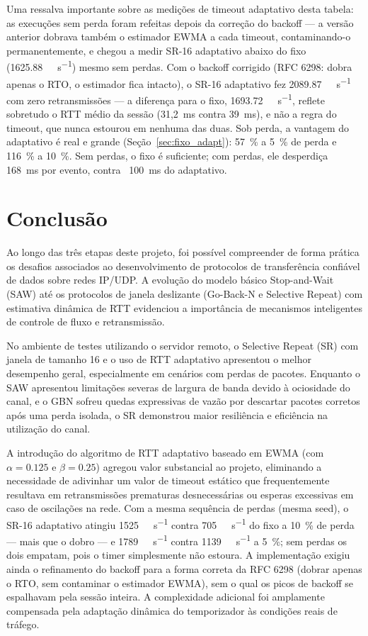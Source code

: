 \documentclass[11pt,a4paper]{article}
\begin{document}
Uma ressalva importante sobre as medições de timeout adaptativo desta tabela: as
execuções sem perda foram refeitas depois da correção do backoff — a versão
anterior dobrava também o estimador EWMA a cada timeout, contaminando-o
permanentemente, e chegou a medir SR-16 adaptativo abaixo do fixo
(\SI{1625.88}{\kilo\bit\per\second}) mesmo sem perdas. Com o backoff corrigido
(RFC 6298: dobra apenas o RTO, o estimador fica intacto), o SR-16 adaptativo
fez \SI{2089.87}{\kilo\bit\per\second} com zero retransmissões — a diferença
para o fixo, \SI{1693.72}{\kilo\bit\per\second}, reflete sobretudo o RTT médio
da sessão (31,2~ms contra 39~ms), e não a regra do timeout, que nunca estourou
em nenhuma das duas. Sob perda, a vantagem do adaptativo é real e grande
(Seção~\ref{sec:fixo_adapt}): \SI{57}{\percent} a \SI{5}{\percent} de perda e
\SI{116}{\percent} a \SI{10}{\percent}. Sem perdas, o fixo é suficiente; com
perdas, ele desperdiça \SI{168}{\milli\second} por evento, contra ~\SI{100}{\milli\second}
do adaptativo.


\section{Conclusão}
Ao longo das três etapas deste projeto, foi possível compreender de forma prática os desafios associados ao desenvolvimento de protocolos de transferência confiável de dados sobre redes IP/UDP. A evolução do modelo básico Stop-and-Wait (SAW) até os protocolos de janela deslizante (Go-Back-N e Selective Repeat) com estimativa dinâmica de RTT evidenciou a importância de mecanismos inteligentes de controle de fluxo e retransmissão.

No ambiente de testes utilizando o servidor remoto, o Selective Repeat (SR) com janela de tamanho 16 e o uso de RTT adaptativo apresentou o melhor desempenho geral, especialmente em cenários com perdas de pacotes. Enquanto o SAW apresentou limitações severas de largura de banda devido à ociosidade do canal, e o GBN sofreu quedas expressivas de vazão por descartar pacotes corretos após uma perda isolada, o SR demonstrou maior resiliência e eficiência na utilização do canal.

A introdução do algoritmo de RTT adaptativo baseado em EWMA (com $\alpha = 0.125$ e $\beta = 0.25$) agregou valor substancial ao projeto, eliminando a necessidade de adivinhar um valor de timeout estático que frequentemente resultava em retransmissões prematuras desnecessárias ou esperas excessivas em caso de oscilações na rede. Com a mesma sequência de perdas (mesma seed), o SR-16 adaptativo atingiu \SI{1525}{\kilo\bit\per\second} contra \SI{705}{\kilo\bit\per\second} do fixo a \SI{10}{\percent} de perda — mais que o dobro — e \SI{1789}{\kilo\bit\per\second} contra \SI{1139}{\kilo\bit\per\second} a \SI{5}{\percent}; sem perdas os dois empatam, pois o timer simplesmente não estoura. A implementação exigiu ainda o refinamento do backoff para a forma correta da RFC 6298 (dobrar apenas o RTO, sem contaminar o estimador EWMA), sem o qual os picos de backoff se espalhavam pela sessão inteira. A complexidade adicional foi amplamente compensada pela adaptação dinâmica do temporizador às condições reais de tráfego.
\end{document}
